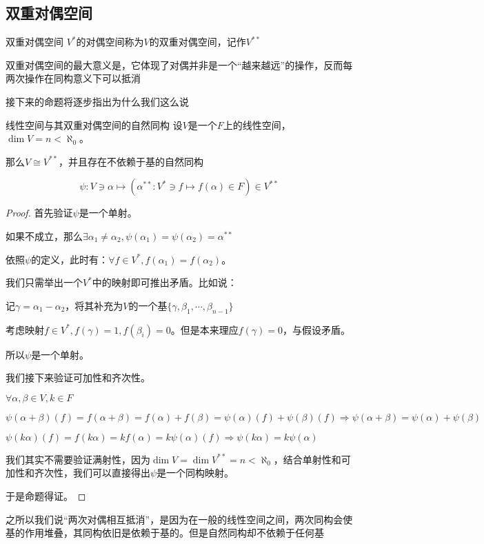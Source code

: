 \documentclass[12pt, a4paper, oneside, UTF8]{ctexbook}
\begin{document}
		\subsection{双重对偶空间}
			\begin{defn}{双重对偶空间}{}
				$V^*$的对偶空间称为$V$的双重对偶空间，记作$V^{**}$
			\end{defn}
			双重对偶空间的最大意义是，它体现了对偶并非是一个“越来越远”的操作，反而每两次操作在同构意义下可以抵消

			接下来的命题将逐步指出为什么我们这么说
			\begin{them}{线性空间与其双重对偶空间的自然同构}{}
				设$V$是一个$F$上的线性空间，$\dim V = n < \aleph_0$。
				
				那么$V \cong V^{**}$，并且存在不依赖于基的自然同构

				\begin{equation}
					\psi : V \ni \alpha \mapsto \left(\alpha^{**}:V^* \ni f \mapsto f(\alpha ) \in F\right) \in V^{**}
				\end{equation}
			\end{them}
			\begin{proof}
				首先验证$\psi $是一个单射。

				如果不成立，那么$\exists \alpha_1 \neq \alpha_2,\psi (\alpha_1)=\psi(\alpha_2)=\alpha^{**}$

				依照$\psi $的定义，此时有：$\forall f \in V^*,f(\alpha_1)=f(\alpha_2)$。

				我们只需举出一个$V^*$中的映射即可推出矛盾。比如说：
				
				记$\gamma =\alpha_1-\alpha_2$，将其补充为$V$的一个基$\{\gamma ,\beta_1,\cdots,\beta_{n-1}\}$

				考虑映射$f\in V^*,f(\gamma )=1,f(\beta_i)=0$。但是本来理应$f(\gamma )=0$，与假设矛盾。

				所以$\psi $是一个单射。

				我们接下来验证可加性和齐次性。

				$\forall \alpha ,\beta \in V,k \in F$

				$\psi (\alpha +\beta )(f) = f(\alpha +\beta )=f(\alpha )+f(\beta )=\psi (\alpha )(f)+\psi (\beta )(f) \Rightarrow \psi (\alpha +\beta )=\psi (\alpha )+\psi (\beta )$
			
				$\psi (k\alpha )(f)=f(k\alpha )=kf(\alpha )=k\psi (\alpha )(f) \Rightarrow \psi (k\alpha )=k\psi (\alpha )$
			
				我们其实不需要验证满射性，因为$\dim V = \dim V^{**} = n < \aleph_0$，结合单射性和可加性和齐次性，我们可以直接得出$\psi $是一个同构映射。
			
				于是命题得证。
			\end{proof}
			之所以我们说“两次对偶相互抵消”，是因为在一般的线性空间之间，两次同构会使基的作用堆叠，其同构依旧是依赖于基的。但是自然同构却不依赖于任何基
\end{document}
